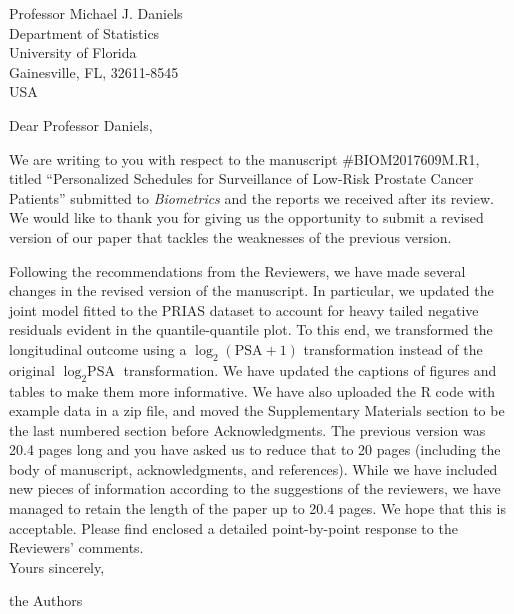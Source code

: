 \documentclass[a4paper, 11pt]{letter}
\begin{document}
\begin{letter}{Professor Michael J. Daniels\\
Department of Statistics\\
University of Florida\\
Gainesville, FL, 32611-8545\\
USA}

\address{Department of Biostatistics\\
Erasmus University Medical Center\\PO Box 2040, 3000 CA Rotterdam\\ the Netherlands
}

\opening{Dear Professor Daniels,}

We are writing to you with respect to the manuscript \#BIOM2017609M.R1, titled ``Personalized Schedules for Surveillance of Low-Risk Prostate Cancer Patients'' submitted to \emph{Biometrics} and the reports we received after its review. We would like to thank you for giving us the opportunity to submit a revised version of our paper that tackles the weaknesses of the previous version.

Following the recommendations from the Reviewers, we have made several changes in the revised version of the manuscript. In particular, we updated the joint model fitted to the PRIAS dataset to account for heavy tailed negative residuals evident in the quantile-quantile plot. To this end, we transformed the longitudinal outcome using a $\log_2(\mbox{PSA}+1)$ transformation instead of the original $\log_2{\mbox{PSA}}$ transformation. We have updated the captions of figures and tables to make them more informative. We have also uploaded the R code with example data in a zip file, and moved the Supplementary Materials section to be the last numbered section before Acknowledgments.  The previous version was 20.4 pages long and you have asked us to reduce that to 20 pages (including the body of manuscript, acknowledgments, and references). While we have included new pieces of information according to the suggestions of the reviewers,  we have managed to retain the length of the paper up to 20.4 pages. We hope that this is acceptable. Please find enclosed a detailed point-by-point response to the Reviewers' comments.\\

Yours sincerely,

the Authors



\end{letter}
\end{document}
